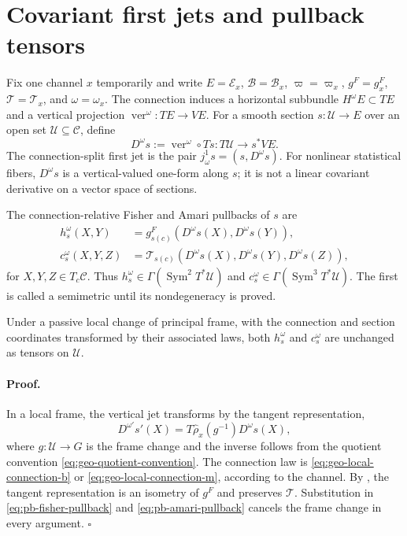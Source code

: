 \section{Covariant first jets and pullback tensors}
\label{sec:pb-covariant-jets}

Fix one channel $x$ temporarily and write $E=\mathcal E_x$,
$\mathcal B=\mathcal B_x$, $\varpi=\varpi_x$, $g^F=g_x^F$,
$\mathcal T=\mathcal T_x$, and $\omega=\omega_x$.  The connection induces a
horizontal subbundle $H^\omega E\subset TE$ and a vertical projection
$\operatorname{ver}^{\omega}:TE\to VE$.  For a smooth section
$s:\mathcal U\to E$ over an open set $\mathcal U\subseteq\mathcal C$, define
\begin{equation}
D^\omega s
:=\operatorname{ver}^{\omega}\circ Ts
:T\mathcal U\longrightarrow s^*VE.
\label{eq:pb-covariant-first-jet}
\end{equation}
The connection-split first jet is the pair
$j^1_\omega s=(s,D^\omega s)$.  For nonlinear statistical fibers,
$D^\omega s$ is a vertical-valued one-form along $s$; it is not a linear
covariant derivative on a vector space of sections.  

The connection-relative Fisher and Amari pullbacks of $s$ are
\begin{align}
h_s^\omega(X,Y)
&=g^F_{s(c)}(D^\omega s(X),D^\omega s(Y)),
\label{eq:pb-fisher-pullback}\\
c_s^\omega(X,Y,Z)
&=\mathcal T_{s(c)}(D^\omega s(X),D^\omega s(Y),D^\omega s(Z)),
\label{eq:pb-amari-pullback}
\end{align}
for $X,Y,Z\in T_c\mathcal C$.  Thus
$h_s^\omega\in\Gamma(\operatorname{Sym}^2T^*\mathcal U)$ and
$c_s^\omega\in\Gamma(\operatorname{Sym}^3T^*\mathcal U)$.  The first is called a
semimetric until its nondegeneracy is proved.  

Under a passive local change of principal frame, with the connection and
section coordinates transformed by their associated laws, both
$h_s^\omega$ and $c_s^\omega$ are unchanged as tensors on $\mathcal U$.

\paragraph{Proof.}
In a local frame, the vertical jet transforms by the tangent representation,
\begin{equation}
D^{\omega'}s'(X)
=T\widehat\rho_x(g^{-1})D^\omega s(X),
\label{eq:pb-covariant-jet-gauge-law}
\end{equation}
where $g:\mathcal U\to G$ is the frame change and the inverse follows from
the quotient convention \eqref{eq:geo-quotient-convention}.  The connection
law is \eqref{eq:geo-local-connection-b} or
\eqref{eq:geo-local-connection-m}, according to the channel.  By
, the tangent representation is an
isometry of $g^F$ and preserves $\mathcal T$.  Substitution in
\eqref{eq:pb-fisher-pullback} and \eqref{eq:pb-amari-pullback} cancels the
frame change in every argument.  $\square$

